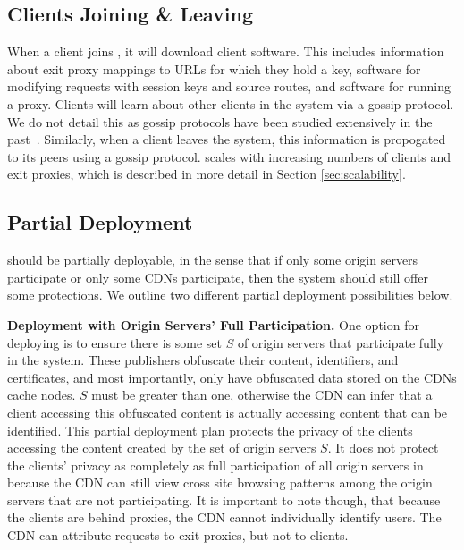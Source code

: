 \subsection{Clients Joining \& Leaving}
\label{sec:join}

When a client joins \system{}, it will download \system{} client software.  This
includes information about exit proxy mappings to URLs for which they hold a key, 
software for modifying requests with session keys and source routes, and software 
for running a proxy.  Clients will learn about other clients in the system via 
a gossip protocol.  We do not detail this as gossip protocols have been studied 
extensively in the past~\cite{kermarrec2007gossiping,vogels2003power,eugster2004epidemic}.  
Similarly, when a client leaves the system, this information is propogated to its 
peers using a gossip protocol.  \system{} scales with increasing numbers of clients and 
exit proxies, which is described in more detail in Section \ref{sec:scalability}.

\subsection{Partial Deployment}
\label{sec:partial}
\system{} should be partially deployable, in the sense that if only some origin servers participate or only some CDNs participate, then 
the system should still offer some protections.  We outline two different partial
deployment possibilities below.

\textbf{Deployment with Origin Servers' Full Participation.}
One option for deploying \system{} is to ensure there is some set $S$ of origin servers that participate fully in the 
system.  These publishers obfuscate their content, identifiers, and certificates, and most importantly, only have 
obfuscated data stored on the CDNs cache nodes.  $S$ must be greater than one, otherwise the CDN can infer 
that a client accessing this obfuscated content is actually accessing content that can be identified.  This partial deployment plan 
 protects the privacy of the clients accessing the content created by the set of origin servers $S$.  It does not 
protect the clients' privacy as completely as full participation of all origin servers in \system{} because the CDN can 
still view cross site browsing patterns among the origin servers that are not participating. It is important to note though, that 
because the clients are behind proxies, the CDN cannot individually identify users.  The CDN can attribute requests to exit proxies, but 
not to clients.  

